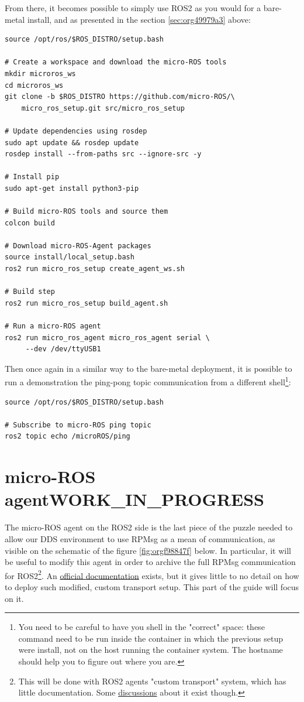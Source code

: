\documentclass[10pt]{article}
\begin{document}
From there, it becomes possible to simply use ROS2 as you would for a bare-metal install,
and as presented in the section \ref{sec:org49979a3} above:
\begin{verbatim}
source /opt/ros/$ROS_DISTRO/setup.bash

# Create a workspace and download the micro-ROS tools
mkdir microros_ws
cd microros_ws
git clone -b $ROS_DISTRO https://github.com/micro-ROS/\
    micro_ros_setup.git src/micro_ros_setup

# Update dependencies using rosdep
sudo apt update && rosdep update
rosdep install --from-paths src --ignore-src -y

# Install pip
sudo apt-get install python3-pip

# Build micro-ROS tools and source them
colcon build

# Download micro-ROS-Agent packages
source install/local_setup.bash
ros2 run micro_ros_setup create_agent_ws.sh

# Build step
ros2 run micro_ros_setup build_agent.sh

# Run a micro-ROS agent
ros2 run micro_ros_agent micro_ros_agent serial \
     --dev /dev/ttyUSB1
\end{verbatim}

Then once again in a similar way to the bare-metal deployment,  it is possible to run a demonstration
the ping-pong topic communication from a different shell\footnote{You need to be careful to have you shell in the "correct" space: these command need to be run inside
the container in which the previous setup were install, not on the host running the container system.
The hostname should help you to figure out where you are.}:
\begin{verbatim}
source /opt/ros/$ROS_DISTRO/setup.bash

# Subscribe to micro-ROS ping topic
ros2 topic echo /microROS/ping
\end{verbatim}
\pagebreak


\section{micro-ROS agent\hfill{}\textsc{WORK\_IN\_PROGRESS}}
\label{sec:org518a7bb}
The micro-ROS agent on the ROS2 side is the last piece of the puzzle needed to
allow our DDS environment to use RPMsg as a mean of communication, as visible
on the schematic of the figure \ref{fig:orgf98847f} below.
In particular, it will be useful to modify this agent in order to archive
the full RPMsg communication for ROS2\footnote{This will be done with ROS2 agents "custom transport"  system,
which has little documentation. Some \href{https://github.com/micro-ROS/micro\_ros\_setup/issues/383}{discussions} about it exist though.}.
An \href{https://micro.ros.org/docs/tutorials/advanced/create\_custom\_transports/}{official documentation} exists, but it gives little to no detail
on how to deploy such modified, custom transport setup.
This part of the guide will focus on it.
\end{document}
